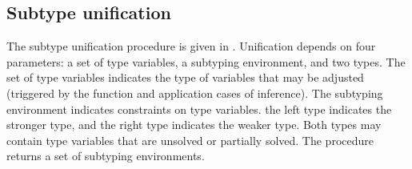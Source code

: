 \documentclass[acmsmall]{acmart}
\begin{document}




\subsection{Subtype unification}
The subtype unification procedure is given in .
Unification depends on four parameters: a set of type variables, a subtyping environment, and two types.
The set of type variables indicates the type of variables that may be adjusted 
(triggered by the function and application cases of inference). 
The subtyping environment indicates constraints on type variables.
the left type indicates the stronger type, and the right type indicates the weaker type.
Both types may contain type variables that are unsolved or partially solved.
The procedure returns a set of subtyping environments.
\end{document}
